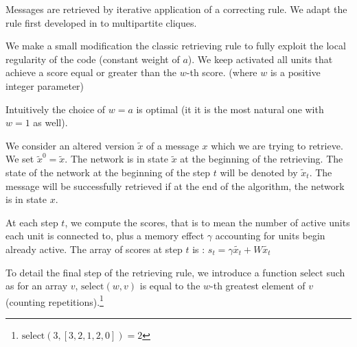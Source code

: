 \documentclass[english,10pt,twocolumn]{IEEEtran}
\theoremstyle{definition}
\begin{document}
		Messages are retrieved by iterative application of a correcting rule. We adapt the rule first developed in \cite{GriBer20117} to multipartite cliques.
		
%		
%	
		

		We make a small modification the classic retrieving rule to fully exploit the local regularity of the code (constant weight of $a$). We keep activated all units that achieve a score equal or greater than the $w$-th score. (where $w$ is a positive integer parameter)
		
		
		
		Intuitively the choice of $w = a$ is optimal (it it is the most natural one with $w = 1$ as well).
		
		
		We consider an altered version $\tilde{x}$ of a message $x$ which we are trying to retrieve. We set $\tilde{x}^0 = \tilde{x}$. The network is in state $\tilde{x}$ at the beginning of the retrieving. The state of the network at the beginning of the step $t$ will be denoted by $\tilde{x}_t$. The message will be successfully retrieved if at the end of the algorithm, the network is in state $x$.
		
		At each step $t$, we compute the scores, that is to mean the number of active units each unit is connected to, plus a memory effect $\gamma $ accounting for units begin already active. The array of scores at step $t$ is :  $s_{t} = \gamma \tilde{x_{t}} + W \tilde{x_{t}}$
		
		To detail the final step of the retrieving rule, we introduce a function $\mbox{select}$ such as for an array $v$, $\mbox{select}(w, v)$ is equal to the $w$-th greatest element of $v$ (counting repetitions).\footnote{$\mbox{select}(3, [3,2,1,2,0]) = 2$}
		
\end{document}
